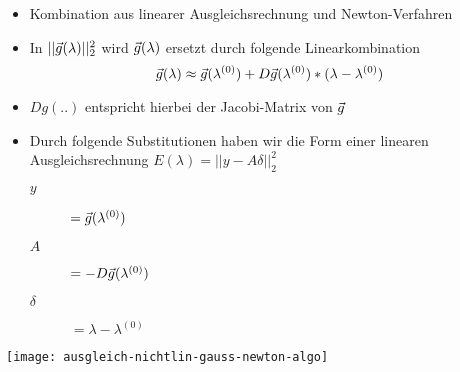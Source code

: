 \begin{itemize}
	\item Kombination aus linearer Ausgleichsrechnung und Newton-Verfahren
	\item In $||\vec g(\lambda) ||_2^2$ wird $\vec g(\lambda)$ ersetzt durch folgende
	      Linearkombination
		      {\large
			      $$\vec g(\lambda) \approx \vec  g(\lambda^{(0)}) + D\vec g(\lambda^{(0)}) * (\lambda
				      - \lambda^{(0)})$$
		      }
	\item $Dg(..)$ entspricht hierbei der Jacobi-Matrix von $\vec g$
    \item Durch folgende Substitutionen haben wir die Form einer linearen Ausgleichsrechnung
        $E(\lambda) = ||y - A \delta||_2^2$
        \begin{description}
            \item[$y$] $= \vec g(\lambda^{(0)})$
            \item[$A$] $= -D\vec g(\lambda^{(0)})$
            \item[$\delta$] $= \lambda - \lambda^{(0)}$
        \end{description}
\end{itemize}



\texttt{[image: ausgleich-nichtlin-gauss-newton-algo]}




